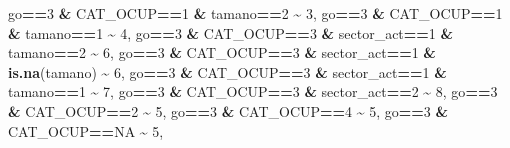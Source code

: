 \documentclass[
]{article}
\newenvironment{Shaded}{\begin{snugshade}}{\end{snugshade}}
\newcommand{\ConstantTok}[1]{\textcolor[rgb]{0.56,0.35,0.01}{#1}}
\newcommand{\DecValTok}[1]{\textcolor[rgb]{0.00,0.00,0.81}{#1}}
\newcommand{\FunctionTok}[1]{\textcolor[rgb]{0.13,0.29,0.53}{\textbf{#1}}}
\newcommand{\NormalTok}[1]{#1}
\newcommand{\SpecialCharTok}[1]{\textcolor[rgb]{0.81,0.36,0.00}{\textbf{#1}}}
\begin{document}
\begin{Shaded}
\begin{Highlighting}[]
\NormalTok{                               go}\SpecialCharTok{==}\DecValTok{3} \SpecialCharTok{\&}\NormalTok{ CAT\_OCUP}\SpecialCharTok{==}\DecValTok{1} \SpecialCharTok{\&}\NormalTok{ tamano}\SpecialCharTok{==}\DecValTok{2} \SpecialCharTok{\textasciitilde{}} \DecValTok{3}\NormalTok{,}
\NormalTok{                               go}\SpecialCharTok{==}\DecValTok{3} \SpecialCharTok{\&}\NormalTok{ CAT\_OCUP}\SpecialCharTok{==}\DecValTok{1} \SpecialCharTok{\&}\NormalTok{ tamano}\SpecialCharTok{==}\DecValTok{1} \SpecialCharTok{\textasciitilde{}} \DecValTok{4}\NormalTok{,}
\NormalTok{                               go}\SpecialCharTok{==}\DecValTok{3} \SpecialCharTok{\&}\NormalTok{ CAT\_OCUP}\SpecialCharTok{==}\DecValTok{3} \SpecialCharTok{\&}\NormalTok{ sector\_act}\SpecialCharTok{==}\DecValTok{1} \SpecialCharTok{\&}\NormalTok{ tamano}\SpecialCharTok{==}\DecValTok{2} \SpecialCharTok{\textasciitilde{}} \DecValTok{6}\NormalTok{,}
\NormalTok{                               go}\SpecialCharTok{==}\DecValTok{3} \SpecialCharTok{\&}\NormalTok{ CAT\_OCUP}\SpecialCharTok{==}\DecValTok{3} \SpecialCharTok{\&}\NormalTok{ sector\_act}\SpecialCharTok{==}\DecValTok{1} \SpecialCharTok{\&} \FunctionTok{is.na}\NormalTok{(tamano) }\SpecialCharTok{\textasciitilde{}} \DecValTok{6}\NormalTok{,}
\NormalTok{                               go}\SpecialCharTok{==}\DecValTok{3} \SpecialCharTok{\&}\NormalTok{ CAT\_OCUP}\SpecialCharTok{==}\DecValTok{3} \SpecialCharTok{\&}\NormalTok{ sector\_act}\SpecialCharTok{==}\DecValTok{1} \SpecialCharTok{\&}\NormalTok{ tamano}\SpecialCharTok{==}\DecValTok{1}  \SpecialCharTok{\textasciitilde{}} \DecValTok{7}\NormalTok{,}
\NormalTok{                               go}\SpecialCharTok{==}\DecValTok{3} \SpecialCharTok{\&}\NormalTok{ CAT\_OCUP}\SpecialCharTok{==}\DecValTok{3} \SpecialCharTok{\&}\NormalTok{ sector\_act}\SpecialCharTok{==}\DecValTok{2} \SpecialCharTok{\textasciitilde{}} \DecValTok{8}\NormalTok{,}
\NormalTok{                               go}\SpecialCharTok{==}\DecValTok{3} \SpecialCharTok{\&}\NormalTok{ CAT\_OCUP}\SpecialCharTok{==}\DecValTok{2} \SpecialCharTok{\textasciitilde{}} \DecValTok{5}\NormalTok{,}
\NormalTok{                               go}\SpecialCharTok{==}\DecValTok{3} \SpecialCharTok{\&}\NormalTok{ CAT\_OCUP}\SpecialCharTok{==}\DecValTok{4} \SpecialCharTok{\textasciitilde{}} \DecValTok{5}\NormalTok{,}
\NormalTok{                               go}\SpecialCharTok{==}\DecValTok{3} \SpecialCharTok{\&}\NormalTok{ CAT\_OCUP}\SpecialCharTok{==}\ConstantTok{NA} \SpecialCharTok{\textasciitilde{}} \DecValTok{5}\NormalTok{,}
         

\end{Highlighting}
\end{Shaded}
\end{document}
